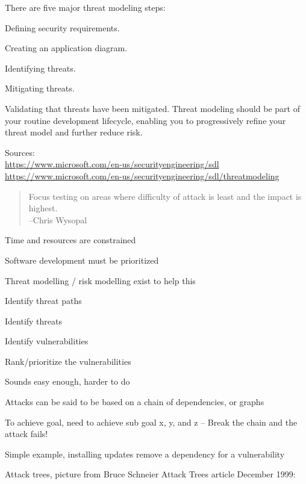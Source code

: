 \documentclass[Screen16to9,17pt]{foils}
\begin{document}

There are five major threat modeling steps:
\begin{list2}
\item Defining security requirements.
\item Creating an application diagram.
\item Identifying threats.
\item Mitigating threats.
\item Validating that threats have been mitigated.
Threat modeling should be part of your routine development lifecycle, enabling you to progressively refine your threat model and further reduce risk.
\end{list2}

Sources:\\
\url{https://www.microsoft.com/en-us/securityengineering/sdl}\\
\url{https://www.microsoft.com/en-us/securityengineering/sdl/threatmodeling}


\begin{quote}
Focus testing on areas where difficulty of attack is least and the impact is highest.\\
  --Chris Wysopal
\end{quote}

\begin{list1}
\item Time and resources are constrained
\item Software development must be prioritized
\item Threat modelling / risk modelling exist to help this
\begin{list2}
\item Identify threat paths
\item Identify threats
\item Identify vulnerabilities
\item Rank/prioritize the vulnerabilities
\end{list2}
\end{list1}

Sounds easy enough, harder to do




\begin{list2}
\item Attacks can be said to be based on a chain of dependencies, or graphs
\item To achieve goal, need to achieve sub goal x, y, and z -- Break the chain and the attack fails!
\item Simple example, installing updates remove a dependency for a vulnerability
\item Attack trees, picture from Bruce Schneier Attack Trees article December 1999:\\ {\footnotesize{}}
\end{list2}
\end{document}
